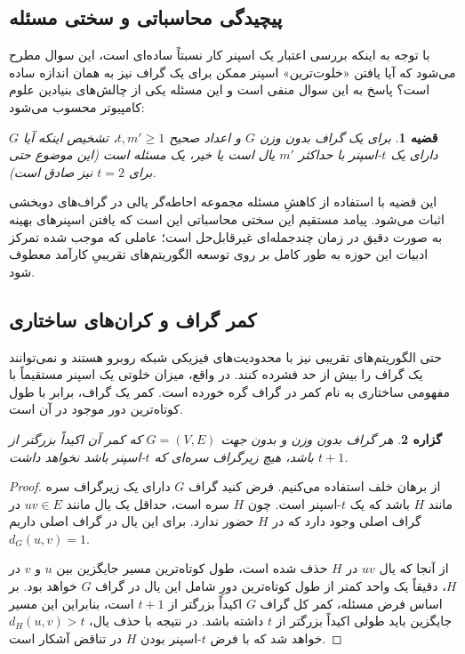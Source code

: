 \documentclass[11pt,a4paper]{report}
\theoremstyle{plain}
\newtheorem{thm}{\normalsize قضیه}[chapter]
\newtheorem{prop}[thm]{\normalsize گزاره}
\theoremstyle{definition}
\theoremstyle{remark}
\begin{document}
\subsection{پیچیدگی محاسباتی و سختی مسئله}
با توجه به اینکه بررسی اعتبار یک اسپنر کار نسبتاً ساده‌ای است، این سوال مطرح می‌شود که آیا یافتن «خلوت‌ترین» اسپنر ممکن برای یک گراف نیز به همان اندازه ساده است؟ پاسخ به این سوال منفی است و این مسئله یکی از چالش‌های بنیادین علوم کامپیوتر محسوب می‌شود:

\begin{thm}
برای یک گراف بدون وزن $G$ و اعداد صحیح $t, m' \ge 1$، تشخیص اینکه آیا $G$ دارای یک $t$-اسپنر با حداکثر $m'$ یال است یا خیر، یک مسئله  است (این موضوع حتی برای $t=2$ نیز صادق است).
\end{thm}
این قضیه با استفاده از کاهشِ مسئله مجموعه احاطه‌گر یالی در گراف‌های دوبخشی اثبات می‌شود. پیامد مستقیم این سختی محاسباتی این است که یافتن اسپنرهای بهینه به صورت دقیق در زمان چندجمله‌ای غیرقابل‌حل است؛ عاملی که موجب شده تمرکز ادبیات این حوزه به طور کامل بر روی توسعه الگوریتم‌های تقریبیِ کارآمد معطوف شود.

\subsection{کمر گراف و کران‌های ساختاری}
حتی الگوریتم‌های تقریبی نیز با محدودیت‌های فیزیکی شبکه روبرو هستند و نمی‌توانند یک گراف را بیش از حد فشرده کنند. در واقع، میزان خلوتی یک اسپنر مستقیماً با مفهومی ساختاری به نام کمر در گراف گره خورده است. کمر یک گراف، برابر با طول کوتاه‌ترین دور موجود در آن است.

\begin{prop}
هر گراف بدون وزن و بدون جهت $G = (V,E)$ که کمر آن اکیداً بزرگتر از $t+1$ باشد، هیچ زیرگراف سره‌ای که $t$-اسپنر باشد نخواهد داشت.
\end{prop}
\begin{proof}
از برهان خلف استفاده می‌کنیم. فرض کنید گراف $G$ دارای یک زیرگراف سره مانند $H$ باشد که یک $t$-اسپنر است. چون $H$ سره است، حداقل یک یال مانند $uv \in E$ در گراف اصلی وجود دارد که در $H$ حضور ندارد. برای این یال در گراف اصلی داریم $d_G(u,v) = 1$. 

از آنجا که یال $uv$ در $H$ حذف شده است، طول کوتاه‌ترین مسیر جایگزین بین $u$ و $v$ در $H$، دقیقاً یک واحد کمتر از طول کوتاه‌ترین دورِ شامل این یال در گراف $G$ خواهد بود. بر اساس فرض مسئله، کمر کل گراف $G$ اکیداً بزرگتر از $t+1$ است، بنابراین این مسیر جایگزین باید طولی اکیداً بزرگتر از $t$ داشته باشد. در نتیجه با حذف یال، $d_H(u,v) > t$ خواهد شد که با فرض $t$-اسپنر بودن $H$ در تناقض آشکار است.
\end{proof}
\end{document}
